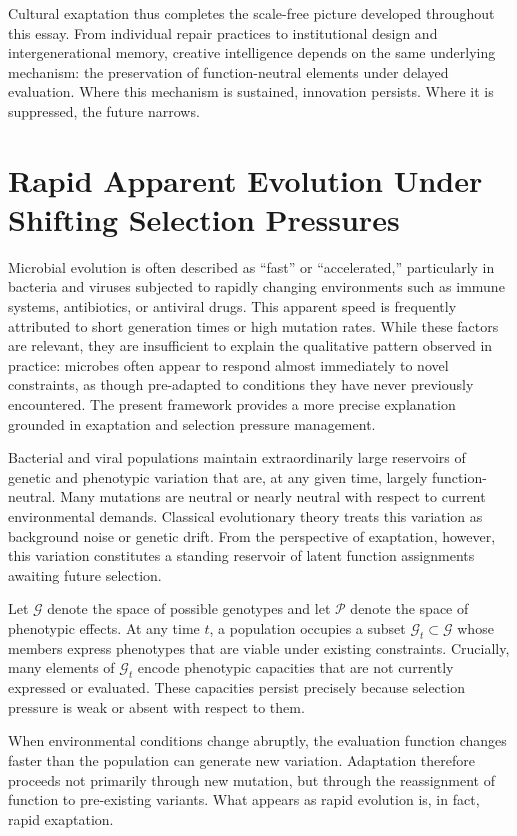 \documentclass[11pt]{article}
\theoremstyle{definition}
\begin{document}
Cultural exaptation thus completes the scale-free picture developed throughout this essay. From individual repair practices to institutional design and intergenerational memory, creative intelligence depends on the same underlying mechanism: the preservation of function-neutral elements under delayed evaluation. Where this mechanism is sustained, innovation persists. Where it is suppressed, the future narrows.

\section{Rapid Apparent Evolution Under Shifting Selection Pressures}

Microbial evolution is often described as ``fast'' or ``accelerated,'' particularly in bacteria and viruses subjected to rapidly changing environments such as immune systems, antibiotics, or antiviral drugs. This apparent speed is frequently attributed to short generation times or high mutation rates. While these factors are relevant, they are insufficient to explain the qualitative pattern observed in practice: microbes often appear to respond almost immediately to novel constraints, as though pre-adapted to conditions they have never previously encountered. The present framework provides a more precise explanation grounded in exaptation and selection pressure management.

Bacterial and viral populations maintain extraordinarily large reservoirs of genetic and phenotypic variation that are, at any given time, largely function-neutral. Many mutations are neutral or nearly neutral with respect to current environmental demands. Classical evolutionary theory treats this variation as background noise or genetic drift. From the perspective of exaptation, however, this variation constitutes a standing reservoir of latent function assignments awaiting future selection.

Let $\mathcal{G}$ denote the space of possible genotypes and let $\mathcal{P}$ denote the space of phenotypic effects. At any time $t$, a population occupies a subset $\mathcal{G}_t \subset \mathcal{G}$ whose members express phenotypes that are viable under existing constraints. Crucially, many elements of $\mathcal{G}_t$ encode phenotypic capacities that are not currently expressed or evaluated. These capacities persist precisely because selection pressure is weak or absent with respect to them.

When environmental conditions change abruptly, the evaluation function changes faster than the population can generate new variation. Adaptation therefore proceeds not primarily through new mutation, but through the reassignment of function to pre-existing variants. What appears as rapid evolution is, in fact, rapid exaptation.
\end{document}
